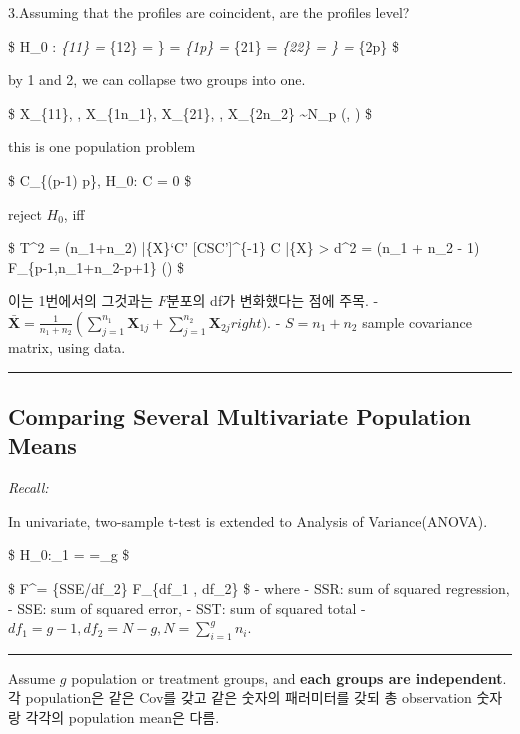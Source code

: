 \documentclass[
]{book}
\begin{document}
{{3.Assuming that the profiles are coincident, are the profiles level?

\$
H\_0 : \mu\emph{\{11\} = \mu}\{12\} = \cdots\} = \mu\emph{\{1p\} = \mu}\{21\} = \mu\emph{\{22\} = \cdots\} = \mu}\{2p\}
\$

by 1 and 2, we can collapse two groups into one.

\$
\pmb X\_\{11\}, \cdots, \pmb X\_\{1n\_1\}, \pmb X\_\{21\}, \cdots, \pmb X\_\{2n\_2\} \sim N\_p (\pmb \mu , \Sigma)
\$

this is one population problem

\$
\exist C\_\{(p-1) \times p\}, H\_0: C \pmb \mu = 0
\$

reject \(H_0\), iff

\$
T\^{}2 = (n\_1+n\_2) \bar \{\pmb X\}`C' {[}CSC'{]}\^{}\{-1\} C \bar \{\pmb X\} \textgreater{} d\^{}2 = (n\_1 + n\_2 - 1)  F\_\{p-1,n\_1+n\_2-p+1\} (\alpha)
\$

이는 1번에서의 그것과는 \(F\)분포의 df가 변화했다는 점에 주목.
- \(\bar {\pmb X} = \tfrac{1}{n_1 + n_2} \left( \sum_{j=1}^{n_1} \pmb X_{1j}+ \sum_{j=1}^{n_2} \pmb X_{2j} right)\).
- \(S = n_1 + n_2\) sample covariance matrix, using data.

\begin{center}\rule{0.5\linewidth}{0.5pt}\end{center}

\hypertarget{comparing-several-multivariate-population-means}{%
\subsection{Comparing Several Multivariate Population Means}\label{comparing-several-multivariate-population-means}}

\emph{Recall:}

In univariate, two-sample t-test is extended to Analysis of Variance(ANOVA).

\$
H\_0:\mu\_1 = \cdots =\mu\_g
\$

\$
F\^{}\ast =  \{SSE/df\_2\}  F\_\{df\_1 , df\_2\}
\$
- where
- SSR: sum of squared regression,
- SSE: sum of squared error,
- SST: sum of squared total
- \(df_1 = g-1, df_2 = N-g, N=\sum_{i=1}^g n_i\).

\begin{center}\rule{0.5\linewidth}{0.5pt}\end{center}

Assume \(g\) population or treatment groups, and \textbf{each groups are independent}. 각 population은 같은 Cov를 갖고 같은 숫자의 패러미터를 갖되 총 observation 숫자랑 각각의 population mean은 다름.

}}
\end{document}
